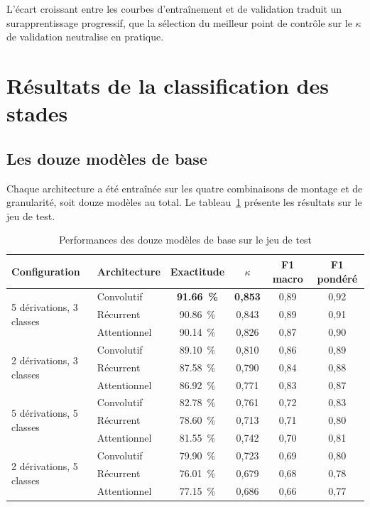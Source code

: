 L'écart croissant entre les courbes d'entraînement et de validation traduit un
surapprentissage progressif, que la sélection du meilleur point de contrôle sur le
$\kappa$ de validation neutralise en pratique.

\section{Résultats de la classification des stades}

\subsection{Les douze modèles de base}

Chaque architecture a été entraînée sur les quatre combinaisons de montage et de
granularité, soit douze modèles au total. Le tableau~\ref{tab:12modeles} présente les
résultats sur le jeu de test.

\begin{table}[H]
\centering
\caption{Performances des douze modèles de base sur le jeu de test}
\label{tab:12modeles}
\small
\begin{tabular}{@{}llcccc@{}}
\toprule
\textbf{Configuration} & \textbf{Architecture} & \textbf{Exactitude} &
\textbf{$\kappa$} & \textbf{F1 macro} & \textbf{F1 pondéré} \\
\midrule
\multirow{3}{*}{5 dérivations, 3 classes}
 & Convolutif   & \textbf{\SI{91,66}{\percent}} & \textbf{0,853} & 0,89 & 0,92 \\
 & Récurrent    & \SI{90,86}{\percent} & 0,843 & 0,89 & 0,91 \\
 & Attentionnel & \SI{90,14}{\percent} & 0,826 & 0,87 & 0,90 \\
\midrule
\multirow{3}{*}{2 dérivations, 3 classes}
 & Convolutif   & \SI{89,10}{\percent} & 0,810 & 0,86 & 0,89 \\
 & Récurrent    & \SI{87,58}{\percent} & 0,790 & 0,84 & 0,88 \\
 & Attentionnel & \SI{86,92}{\percent} & 0,771 & 0,83 & 0,87 \\
\midrule
\multirow{3}{*}{5 dérivations, 5 classes}
 & Convolutif   & \SI{82,78}{\percent} & 0,761 & 0,72 & 0,83 \\
 & Récurrent    & \SI{78,60}{\percent} & 0,713 & 0,71 & 0,80 \\
 & Attentionnel & \SI{81,55}{\percent} & 0,742 & 0,70 & 0,81 \\
\midrule
\multirow{3}{*}{2 dérivations, 5 classes}
 & Convolutif   & \SI{79,90}{\percent} & 0,723 & 0,69 & 0,80 \\
 & Récurrent    & \SI{76,01}{\percent} & 0,679 & 0,68 & 0,78 \\
 & Attentionnel & \SI{77,15}{\percent} & 0,686 & 0,66 & 0,77 \\
\bottomrule
\end{tabular}
\end{table}

